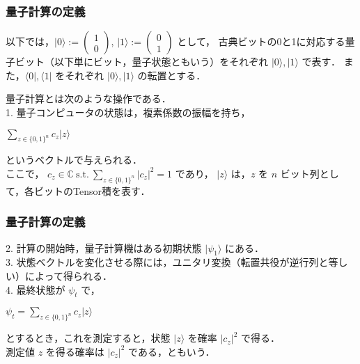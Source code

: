 \documentclass[dvipdfmx,12pt]{beamer}
\begin{document}
\begin{frame}

\frametitle{量子計算の定義}

以下では，$ | 0 \rangle := \left( \begin{array}{c} 1 \\ 0 \end{array} \right) $, $ | 1 \rangle := \left( \begin{array}{c} 0 \\ 1 \end{array} \right) $ として，
古典ビットの0と1に対応する量子ビット（以下単にビット，量子状態ともいう）をそれぞれ $ | 0 \rangle, | 1 \rangle $ で表す．
また，$ \langle 0 |, \langle 1 | $ をそれぞれ $ | 0 \rangle, | 1 \rangle $ の転置とする．

\vspace{10pt}

量子計算とは次のような操作である\cite{森前}．\\
1. 量子コンピュータの状態は，複素係数の振幅を持ち，\\

\begin{center}
    $ \displaystyle \sum_{z \in \{ 0, 1 \}^n } c_z | z \rangle $
\end{center}

というベクトルで与えられる．\\
ここで， $ c_z \in \mathbb{C} \ \mathrm{s.t.} \ \sum_{z \in \{ 0, 1 \}^n } |c_z|^2 = 1 $ であり，
$ | z \rangle $ は，$ z $ を $n$ ビット列として，各ビットのTensor積を表す．\\

\end{frame}


\begin{frame}

\frametitle{量子計算の定義}

2. 計算の開始時，量子計算機はある初期状態 $ | \psi_1 \rangle $ にある． \\
3. 状態ベクトルを変化させる際には，ユニタリ変換（転置共役が逆行列と等しい）によって得られる． \\
4. 最終状態が $ \psi_t $ で，\\

\begin{center}
    $ \displaystyle \psi_t = \sum_{z \in \{ 0, 1 \}^n } c_z | z \rangle $
\end{center}

とするとき，これを測定すると，状態 $ | z \rangle $ を確率 $ | c_z |^2 $ で得る． \\
測定値 $z$ を得る確率は $ | c_z |^2 $ である，ともいう．
            
\end{frame}
\end{document}
